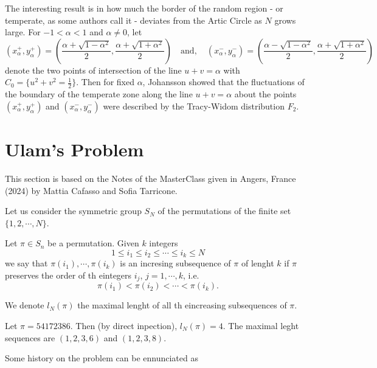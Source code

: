 The interesting result is in how much the border of the random region - or temperate, as some authors call it - deviates from the Artic Circle as $N$ grows large. For $-1 < \alpha < 1$ and $\alpha \neq 0$, let
\begin{equation}
		(x_\alpha^+, y_\alpha^+) = \left( 	\frac{\alpha + \sqrt{1-\alpha^2}}{2} , \frac{\alpha + \sqrt{1+\alpha^2}}{2}\right) \quad \text{and}, \quad (x_\alpha^-, y_\alpha^-) = \left( 	\frac{\alpha - \sqrt{1-\alpha^2}}{2} , \frac{\alpha + \sqrt{1+\alpha^2}}{2}\right) 
\end{equation}
denote the two points of intersection of the line $u + v = \alpha$ with $C_0 = \{u^2 + v^2 = \frac{1}{2}\}$. Then for fixed $\alpha$, Johansson showed that the fluctuations of the boundary of the temperate zone along the line $u + v = \alpha$ about the points $(x_\alpha^+ , y_\alpha^+ )$ and $(x_\alpha^- , y_\alpha^-)$ were described by the Tracy-Widom distribution $F_2$.

\section{Ulam's Problem}

This section is based on the Notes of the MasterClass given in Angers, France (2024) by Mattia Cafasso and Sofia Tarricone.

Let us consider the symmetric group $S_N$ of the permutations of the finite set $\{1, 2, \cdots, N\}$.
\begin{definition}
	Let $\pi \in S_n$ be a permutation. Given $k$ integers
	\begin{equation}
		1 \leq i_1 \leq i_2 \leq \cdots \leq i_k \leq N
	\end{equation}
	we say that $\pi(i_1), \cdots, \pi(i_k)$ is an incresing subsequence of $\pi$ of lenght $k$ if $\pi$ preserves the order of th eintegers $i_j$, $j = 1, \cdots, k$, i.e.
	\begin{equation}
		\pi(i_1) < \pi(i_2) < \cdots < \pi(i_k).
	\end{equation}
\end{definition}
We denote $l_N(\pi)$ the maximal lenght of all th eincreasing subsequences of $\pi$.

\begin{ex}
	Let $\pi = 54172386$. Then (by direct inpection), $l_N(\pi) = 4$. The maximal leght sequences are $(1, 2, 3, 6)$ and $(1, 2, 3, 8)$.
\end{ex}

Some history on the problem can be ennunciated as

